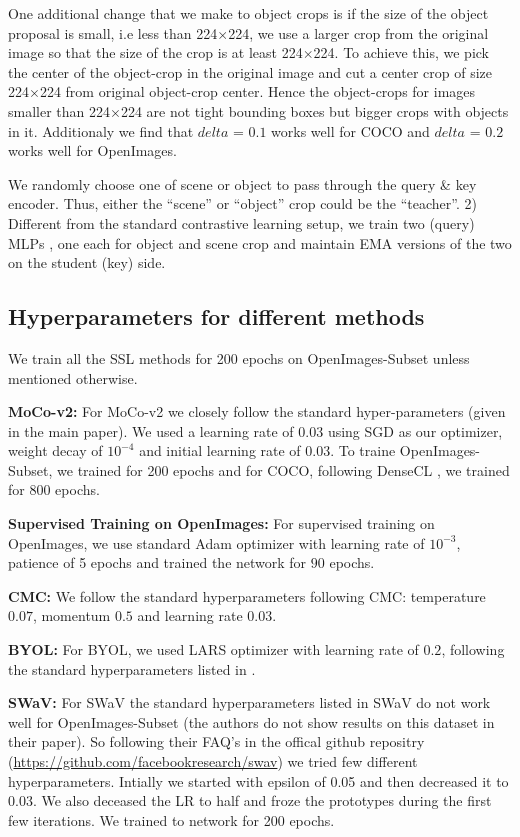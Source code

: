 One additional change that we make to object crops is if the size of the object proposal is small, i.e less than 224$\times$224, we use a larger crop from the original image so that the size of the crop is at least 224$\times$224. To achieve this, we pick the center of the object-crop in the original image and cut a center crop of size 224$\times$224 from original object-crop center. Hence the object-crops for images smaller than 224$\times$224 are not tight bounding boxes but bigger crops with objects in it. Additionaly we find that $delta$ = $0.1$ works well for COCO and  $delta$ = $0.2$ works well for OpenImages.

{We randomly choose one of scene or object to pass through the query & key encoder. Thus, either the “scene” or “object” crop could be the “teacher”. 2) Different from the standard contrastive learning setup, we train two (query) MLPs , one each for object and scene crop and maintain EMA versions of the two on the student (key) side.} 

\subsection{Hyperparameters for different methods}
We train all the SSL methods for 200 epochs on OpenImages-Subset unless mentioned otherwise. 

\textbf{MoCo-v2:} For MoCo-v2 \citep{chen2020improved} we closely follow the standard hyper-parameters (given in the main paper). We used a learning rate of $0.03$ using SGD as our optimizer, weight decay of $10^{-4}$ and initial learning rate of $0.03$. To traine OpenImages-Subset, we trained for 200 epochs and for COCO, following DenseCL \citep{wang2021dense}, we trained for 800 epochs.

\textbf{Supervised Training on OpenImages:} For supervised training on OpenImages, we use standard Adam optimizer with learning rate of $10^{-3}$, patience of 5 epochs and trained the network for $90$ epochs. 

\textbf{CMC:} We follow the standard hyperparameters following CMC\citep{tian2019contrastive}: temperature $0.07$, momentum $0.5$ and learning rate $0.03$. 

\textbf{BYOL:} For BYOL, we used LARS optimizer with learning rate of $0.2$, following the standard hyperparameters listed in \citep{grill2020bootstrap}. 

\textbf{SWaV:} For SWaV the standard hyperparameters listed in SWaV \citep{NEURIPS2020_70feb62b} do not work well for OpenImages-Subset (the authors do not show results on this dataset in their paper). So following their FAQ's in the offical github repositry (\url{https://github.com/facebookresearch/swav}) we tried few different hyperparameters. Intially we started with epsilon of 0.05 and then decreased it to 0.03. We also deceased the LR to half and froze the prototypes during the first few iterations. We trained to network for 200 epochs.


